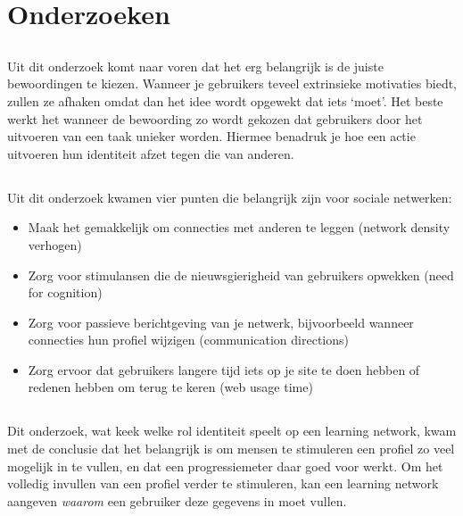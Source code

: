 \documentclass[a4paper, 10pt, pdftex]{report}
\begin{document}
    \section{Onderzoeken}
      \subsection{\cite{Beenen2004}}
      Uit dit onderzoek komt naar voren dat het erg belangrijk is de juiste bewoordingen te kiezen. Wanneer je gebruikers teveel extrinsieke motivaties biedt, zullen ze afhaken omdat dan het idee wordt opgewekt dat iets `moet'. Het beste werkt het wanneer de bewoording zo wordt gekozen dat gebruikers door het uitvoeren van een taak unieker worden. Hiermee benadruk je hoe een actie uitvoeren hun identiteit afzet tegen die van anderen.

      \subsection{\cite{Sohn2005}}
        Uit dit onderzoek kwamen vier punten die belangrijk zijn voor sociale netwerken:
        \begin{itemize}
          \item Maak het gemakkelijk om connecties met anderen te leggen (network density verhogen)
          \item Zorg voor stimulansen die de nieuwsgierigheid van gebruikers opwekken (need for cognition)
          \item Zorg voor passieve berichtgeving van je netwerk, bijvoorbeeld wanneer connecties hun profiel wijzigen (communication directions)
          \item Zorg ervoor dat gebruikers langere tijd iets op je site te doen hebben of redenen hebben om terug te keren (web usage time)
        \end{itemize}

      \subsection{\cite{Brouns2008}}
        Dit onderzoek, wat keek welke rol identiteit speelt op een learning network, kwam met de conclusie dat het belangrijk is om mensen te stimuleren een profiel zo veel mogelijk in te vullen, en dat een progressiemeter daar goed voor werkt. Om het volledig invullen van een profiel verder te stimuleren, kan een learning network aangeven \emph{waarom} een gebruiker deze gegevens in moet vullen.
\end{document}
